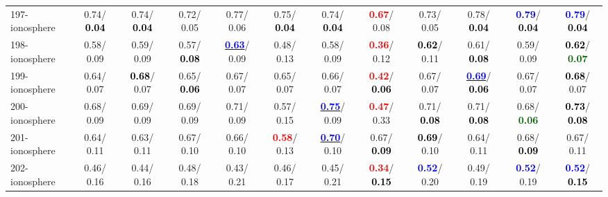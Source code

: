 \begin{table}[h]
\begin{center}
{\begin{tabular}{lc|c|c|c|c|c|c|c|c|c|c}
197-ionosphere &   0.74/\textcolor{black}{\textbf{  0.04}} &   0.74/\textcolor{black}{\textbf{  0.04}} &   0.72/  0.05 &   0.77/  0.06 &   0.75/\textcolor{black}{\textbf{  0.04}} &   0.74/\textcolor{black}{\textbf{  0.04}} & \textcolor{red}{\textbf{  0.67}}/  0.08 &   0.73/  0.05 &   0.78/\textcolor{black}{\textbf{  0.04}} & \textcolor{blue}{\textbf{  0.79}}/\textcolor{black}{\textbf{  0.04}} & \textcolor{blue}{\textbf{  0.79}}/\textcolor{black}{\textbf{  0.04}} \\
198-ionosphere &   0.58/  0.09 &   0.59/  0.09 &   0.57/\textcolor{black}{\textbf{  0.08}} & \underline{\textcolor{blue}{\textbf{  0.63}}}/  0.09 &   0.48/  0.13 &   0.58/  0.09 & \textcolor{red}{\textbf{  0.36}}/  0.12 & \textcolor{black}{\textbf{  0.62}}/  0.11 &   0.61/\textcolor{black}{\textbf{  0.08}} &   0.59/  0.09 & \textcolor{black}{\textbf{  0.62}}/\textcolor{darkgreen}{\textbf{  0.07}} \\
199-ionosphere &   0.64/  0.07 & \textcolor{black}{\textbf{  0.68}}/  0.07 &   0.65/\textcolor{black}{\textbf{  0.06}} &   0.67/  0.07 &   0.65/  0.07 &   0.66/  0.07 & \textcolor{red}{\textbf{  0.42}}/\textcolor{black}{\textbf{  0.06}} &   0.67/  0.07 & \underline{\textcolor{blue}{\textbf{  0.69}}}/\textcolor{black}{\textbf{  0.06}} &   0.67/  0.07 & \textcolor{black}{\textbf{  0.68}}/  0.07 \\ \hline
200-ionosphere &   0.68/  0.09 &   0.69/  0.09 &   0.69/  0.09 &   0.71/  0.09 &   0.57/  0.15 & \underline{\textcolor{blue}{\textbf{  0.75}}}/  0.09 & \textcolor{red}{\textbf{  0.47}}/  0.33 &   0.71/\textcolor{black}{\textbf{  0.08}} &   0.71/\textcolor{black}{\textbf{  0.08}} &   0.68/\textcolor{darkgreen}{\textbf{  0.06}} & \textcolor{black}{\textbf{  0.73}}/\textcolor{black}{\textbf{  0.08}} \\
201-ionosphere &   0.64/  0.11 &   0.63/  0.11 &   0.67/  0.10 &   0.66/  0.10 & \textcolor{red}{\textbf{  0.58}}/  0.13 & \underline{\textcolor{blue}{\textbf{  0.70}}}/  0.10 &   0.67/\textcolor{black}{\textbf{  0.09}} & \textcolor{black}{\textbf{  0.69}}/  0.10 &   0.64/  0.11 &   0.68/\textcolor{black}{\textbf{  0.09}} &   0.67/  0.11 \\
202-ionosphere &   0.46/  0.16 &   0.44/  0.16 &   0.48/  0.18 &   0.43/  0.21 &   0.46/  0.17 &   0.45/  0.21 & \textcolor{red}{\textbf{  0.34}}/\textcolor{black}{\textbf{  0.15}} & \textcolor{blue}{\textbf{  0.52}}/  0.20 &   0.49/  0.19 & \textcolor{blue}{\textbf{  0.52}}/  0.19 & \textcolor{blue}{\textbf{  0.52}}/\textcolor{black}{\textbf{  0.15}} \\

\end{tabular}}
\end{center}
\end{table}
